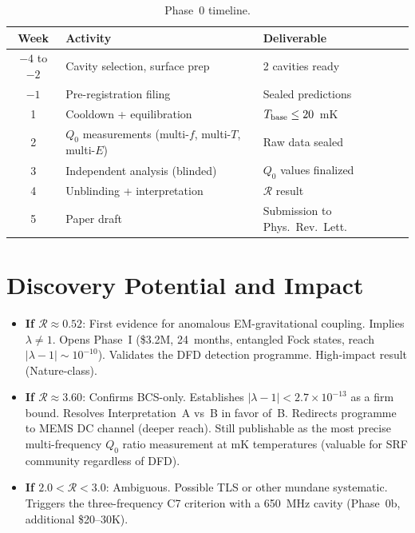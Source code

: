 \documentclass[11pt]{article}
\newcommand{\ee}[1]{\times 10^{#1}}
\newcommand{\lbone}{|\lambda - 1|}
\theoremstyle{definition}
\theoremstyle{remark}
\begin{document}
\begin{table}[H]
\centering
\caption{Phase~0 timeline.}
\renewcommand{\arraystretch}{1.3}
\begin{tabular}{@{}cll@{}}
\toprule
\textbf{Week} & \textbf{Activity} & \textbf{Deliverable} \\
\midrule
$-4$ to $-2$ & Cavity selection, surface prep & 2 cavities ready \\
$-1$ & Pre-registration filing & Sealed predictions \\
1 & Cooldown + equilibration & $T_{\rm base} \leq 20$~mK \\
2 & $Q_0$ measurements (multi-$f$, multi-$T$, multi-$E$) &
  Raw data sealed \\
3 & Independent analysis (blinded) & $Q_0$ values finalized \\
4 & Unblinding + interpretation & $\mathcal{R}$ result \\
5 & Paper draft & Submission to Phys.\ Rev.\ Lett. \\
\bottomrule
\end{tabular}
\end{table}


\section{Discovery Potential and Impact}

\begin{itemize}
\item \textbf{If $\mathcal{R} \approx 0.52$}: First evidence for
  anomalous EM-gravitational coupling. Implies $\lambda \neq 1$.
  Opens Phase~I (\$3.2M, 24~months, entangled Fock states, reach
  $\lbone \sim 10^{-10}$). Validates the DFD detection programme.
  High-impact result (Nature-class).

\item \textbf{If $\mathcal{R} \approx 3.60$}: Confirms BCS-only.
  Establishes $\lbone < 2.7\ee{-13}$ as a firm bound. Resolves
  Interpretation~A vs~B in favor of~B. Redirects programme to
  MEMS DC channel (deeper reach). Still publishable as the most
  precise multi-frequency $Q_0$ ratio measurement at mK temperatures
  (valuable for SRF community regardless of DFD).

\item \textbf{If $2.0 < \mathcal{R} < 3.0$}: Ambiguous.
  Possible TLS or other mundane systematic. Triggers the
  three-frequency C7 criterion with a 650~MHz cavity (Phase~0b,
  additional \$20--30K).
\end{itemize}
\end{document}
